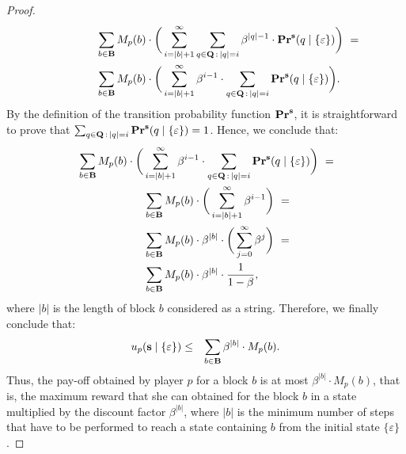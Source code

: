 \begin{proof}
\begin{align*}
&\hspace{40pt}  \sum_{b \in \mathbf{B}} M_p(b) \cdot\bigg(\sum_{i=|b|+1}^\infty \sum_{q \in \mathbf{Q} \,:\, |q| = i} \beta^{|q|-1}  \cdot \mathbf{Pr}^{\mathbf{s}}(q \mid \{\varepsilon\})\bigg) \ = \\
&\hspace{40pt}  \sum_{b \in \mathbf{B}} M_p(b) \cdot\bigg(\sum_{i=|b|+1}^\infty \beta^{i-1} \cdot \sum_{q \in \mathbf{Q} \,:\, |q| = i} \mathbf{Pr}^{\mathbf{s}}(q \mid \{\varepsilon\})\bigg).
\end{align*}
By the definition of the transition probability function $\mathbf{Pr}^{\mathbf{s}}$, it is straightforward to prove that $\sum_{q \in \mathbf{Q} \,:\, |q| = i} \mathbf{Pr}^{\mathbf{s}}(q \mid \{\varepsilon\}) = 1$. Hence, we conclude that:
\begin{align*}
&\sum_{b \in \mathbf{B}} M_p(b) \cdot\bigg(\sum_{i=|b|+1}^\infty \beta^{i-1} \cdot \sum_{q \in \mathbf{Q} \,:\, |q| = i} \mathbf{Pr}^{\mathbf{s}}(q \mid \{\varepsilon\})\bigg) \ = \\
&\hspace{60pt}  \sum_{b \in \mathbf{B}} M_p(b) \cdot\bigg(\sum_{i=|b|+1}^\infty \beta^{i-1}\bigg) \ = \\
&\hspace{60pt}  \sum_{b \in \mathbf{B}} M_p(b) \cdot \beta^{|b|} \cdot \bigg(\sum_{j=0}^\infty \beta^{j}\bigg) \ = \\
&\hspace{60pt}  \sum_{b \in \mathbf{B}} M_p(b) \cdot \beta^{|b|} \cdot \frac{1}{1-\beta},
\end{align*}
where $|b|$ is the length of block $b$ considered as a string. Therefore, we finally conclude that:
\begin{eqnarray*}
u_p(\mathbf{s} \mid \{\varepsilon\}) & \leq &  \sum_{b \in \mathbf{B}} \beta^{|b|} \cdot M_p(b).
\end{eqnarray*}
Thus, the pay-off obtained by player $p$ for a block $b$ is at most $\beta^{|b|} \cdot M_p(b)$, that is, the maximum reward that she can obtained for the block $b$ in a state multiplied by the discount factor $\beta^{|b|}$, where $|b|$ is the minimum number of steps that have to be performed to reach a state containing $b$ from the initial state $\{\varepsilon\}$.




\end{proof}
